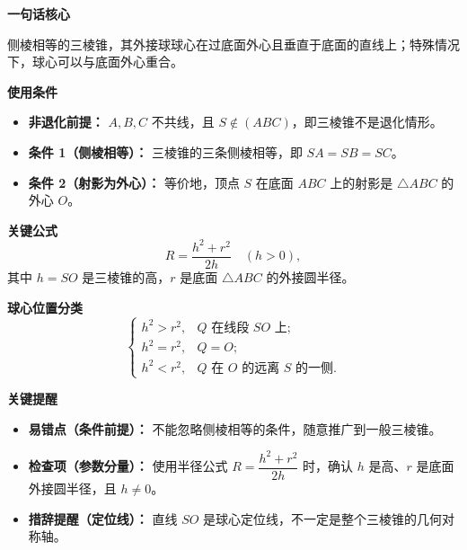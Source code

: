 \begin{summarybox}
	\textbf{\textcolor{CSummary}{一句话核心}}

	侧棱相等的三棱锥，其外接球球心在过底面外心且垂直于底面的直线上；特殊情况下，球心可以与底面外心重合。

	\medskip
	\textbf{\textcolor{CSummary}{使用条件}}
	\begin{itemize}[leftmargin=*, itemsep=0.5em, topsep=0.4em]
		\item \textbf{非退化前提：} $A,B,C$ 不共线，且 $S\notin(ABC)$，即三棱锥不是退化情形。
		\item \textbf{条件 1（侧棱相等）：} 三棱锥的三条侧棱相等，即 $SA=SB=SC$。
		\item \textbf{条件 2（射影为外心）：} 等价地，顶点 $S$ 在底面 $ABC$ 上的射影是 $\triangle ABC$ 的外心 $O$。
	\end{itemize}

	\medskip
	\textbf{\textcolor{CSummary}{关键公式}}
	\[
		R=\frac{h^{2}+r^{2}}{2h}\quad (h>0),
	\]
	其中 $h=SO$ 是三棱锥的高，$r$ 是底面 $\triangle ABC$ 的外接圆半径。

	\medskip
	\textbf{\textcolor{CSummary}{球心位置分类}}
	\[
		\begin{cases}
			h^{2}>r^{2}, & Q \text{ 在线段 } SO \text{ 上};               \\[4pt]
			h^{2}=r^{2}, & Q=O;                                       \\[4pt]
			h^{2}<r^{2}, & Q \text{ 在 } O \text{ 的远离 } S \text{ 的一侧}.
		\end{cases}
	\]

	\medskip
	\textbf{\textcolor{CSummary}{关键提醒}}
	\begin{itemize}[leftmargin=*, itemsep=0.5em, topsep=0.4em]
		\item \textbf{易错点（条件前提）：} 不能忽略侧棱相等的条件，随意推广到一般三棱锥。
		\item \textbf{检查项（参数分量）：} 使用半径公式 $R = \dfrac{h^{2}+r^{2}}{2h}$ 时，确认 $h$ 是高、$r$ 是底面外接圆半径，且 $h\neq 0$。
		\item \textbf{措辞提醒（定位线）：} 直线 $SO$ 是球心定位线，不一定是整个三棱锥的几何对称轴。
	\end{itemize}
\end{summarybox}